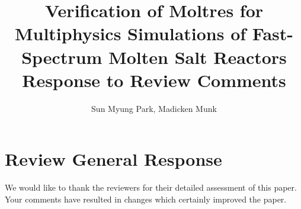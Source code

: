 \documentclass[answers,12pt]{exam}
\begin{document}


%

\title{Verification of Moltres for Multiphysics Simulations of
Fast-Spectrum Molten Salt Reactors\\
        \large Response to Review Comments}
\author{Sun Myung Park, Madicken Munk}
\date{}



%
\maketitle
\section*{Review General Response}
We would like to thank the reviewers for their detailed assessment of this
paper. Your comments have resulted in changes which certainly improved the
paper.
\end{document}
